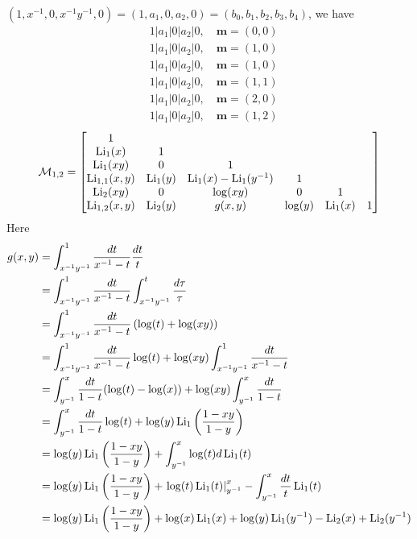 \documentclass[main]{subfiles}
\begin{document}
\begin{example}
$(1,x^{-1},0,x^{-1}y^{-1},0)=(1,a_1,0,a_2,0)=(b_0,b_1,b_2,b_3,b_4)$, we have
\begin{align*}
&\boxed{1}|a_1|0|a_2|\boxed0, \quad\mathbf m=(0,0) \\
&\boxed{1}|\boxed{a_1}|0|a_2|\boxed0, \quad\mathbf m=(1,0) \\
&\boxed{1}|a_1|0|\boxed{a_2}|\boxed0, \quad\mathbf m=(1,0) \\
&\boxed{1}|\boxed{a_1}|0|\boxed{a_2}|\boxed0, \quad\mathbf m=(1,1) \\
&\boxed{1}|a_1|\boxed0|\boxed{a_2}|\boxed0, \quad\mathbf m=(2,0) \\
&\boxed{1}|\boxed{a_1}|\boxed0|\boxed{a_2}|\boxed0, \quad\mathbf m=(1,2)
\end{align*}
\begin{align*}
\mathcal M_{1,2}=\begin{bmatrix}
1	&	&	&	&	& \\
\operatorname{Li}_1(x)	&1	&	&	&	& \\
\operatorname{Li}_1(xy)    &0	&1	&	&	&	\\
\operatorname{Li}_{1,1}(x,y)    &\operatorname{Li}_1(y)	&\operatorname{Li}_1(x)-\operatorname{Li}_1(y^{-1})	&1	&	& \\
\operatorname{Li}_2(xy)    &0	&\log(xy)	&0	&1	& \\
\operatorname{Li}_{1,2}(x,y)    &	\operatorname{Li}_2(y)&g(x,y)	&\log(y)	&\operatorname{Li}_1(x)	&1 \\
\end{bmatrix}
\end{align*}
Here
\begin{align*}
g(x,y)&=\int_{x^{-1}y^{-1}}^1\frac{dt}{x^{-1}-t}\frac{dt}{t} \\
&=\int_{x^{-1}y^{-1}}^1\frac{dt}{x^{-1}-t}\int_{x^{-1}y^{-1}}^t\frac{d\tau}{\tau} \\
&=\int_{x^{-1}y^{-1}}^1\frac{dt}{x^{-1}-t}\left(\log(t)+\log(xy)\right) \\
&=\int_{x^{-1}y^{-1}}^1\frac{dt}{x^{-1}-t}\log(t)+\log(xy)\int_{x^{-1}y^{-1}}^1\frac{dt}{x^{-1}-t} \\
&=\int_{y^{-1}}^x\frac{dt}{1-t}(\log(t)-\log(x))+\log(xy)\int_{y^{-1}}^x\frac{dt}{1-t} \\
&=\int_{y^{-1}}^x\frac{dt}{1-t}\log(t)+\log(y)\operatorname{Li}_1\left(\frac{1-xy}{1-y}\right) \\
&=\log(y)\operatorname{Li}_1\left(\frac{1-xy}{1-y}\right)+\int_{y^{-1}}^x\log(t)d\operatorname{Li}_1(t) \\
&=\log(y)\operatorname{Li}_1\left(\frac{1-xy}{1-y}\right)+\left.\log(t)\operatorname{Li}_1(t)\right|_{y^{-1}}^x-\int_{y^{-1}}^x\frac{dt}{t}\operatorname{Li}_1(t) \\
&=\log(y)\operatorname{Li}_1\left(\frac{1-xy}{1-y}\right)+\log(x)\operatorname{Li}_1(x)+\log(y)\operatorname{Li}_1(y^{-1})-\operatorname{Li}_2(x)+\operatorname{Li}_2(y^{-1}) \\
\end{align*}
\end{example}
\end{document}
